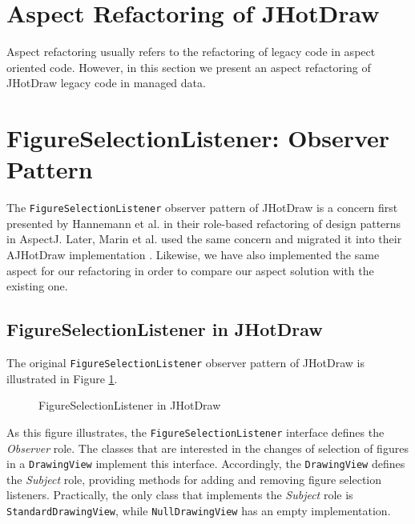 \section{Aspect Refactoring of JHotDraw}
Aspect refactoring usually refers to the refactoring of legacy code in aspect oriented code. 
However, in this section we present an aspect refactoring of JHotDraw legacy code in managed data.

\section{FigureSelectionListener: Observer Pattern}
The \texttt{FigureSelectionListener} observer pattern of JHotDraw is a concern first presented by Hannemann et al. \cite{hannemann2005role} in their role-based refactoring of design patterns in AspectJ. 
Later, Marin et al. used the same concern and migrated it into their AJHotDraw implementation \cite{marin2005approach}.
Likewise, we have also implemented the same aspect for our refactoring in order to compare our aspect solution with the existing one.

\subsection{FigureSelectionListener in JHotDraw}
The original \texttt{FigureSelectionListener} observer pattern of JHotDraw is illustrated in Figure \ref{fig:JHotDraw_FigureSelectionListener_OOP}.

\begin{figure}[H]
	\centering
  	\caption{FigureSelectionListener in JHotDraw}
  	\label{fig:JHotDraw_FigureSelectionListener_OOP}
\end{figure}

As this figure illustrates, the \texttt{FigureSelectionListener} interface defines the \textit{Observer} role.
The classes that are interested in the changes of selection of figures in a \texttt{DrawingView} implement this interface.
Accordingly, the \texttt{DrawingView} defines the \textit{Subject} role, providing methods for adding and removing figure selection listeners.
Practically, the only class that implements the \textit{Subject} role is \texttt{StandardDrawingView}, while \texttt{NullDrawingView} has an empty implementation.

